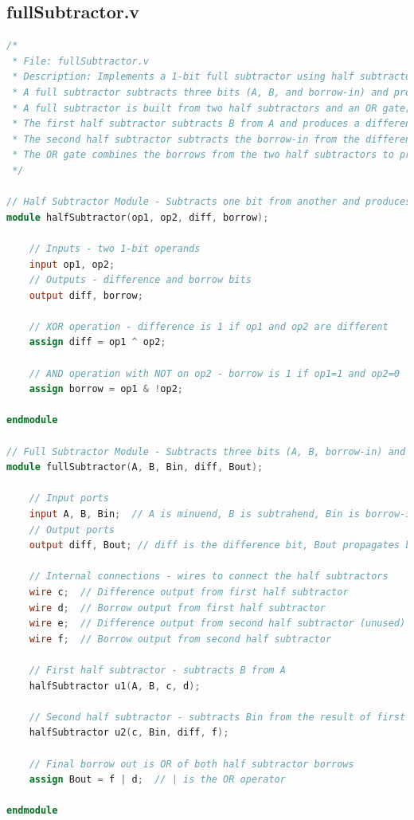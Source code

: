 \documentclass[a4paper,12pt]{article}
\begin{document}
\subsection*{fullSubtractor.v}
\begin{lstlisting}[language=Verilog]
/*
 * File: fullSubtractor.v
 * Description: Implements a 1-bit full subtractor using half subtractors
 * A full subtractor subtracts three bits (A, B, and borrow-in) and produces difference and borrow-out
 * A full subtractor is built from two half subtractors and an OR gate; 
 * The first half subtractor subtracts B from A and produces a difference and a borrow
 * The second half subtractor subtracts the borrow-in from the difference of the first half subtractor
 * The OR gate combines the borrows from the two half subtractors to produce the final borrow-out
 */

// Half Subtractor Module - Subtracts one bit from another and produces difference and borrow
module halfSubtractor(op1, op2, diff, borrow);

    // Inputs - two 1-bit operands
    input op1, op2;
    // Outputs - difference and borrow bits
    output diff, borrow;

    // XOR operation - difference is 1 if op1 and op2 are different
    assign diff = op1 ^ op2;

    // AND operation with NOT on op2 - borrow is 1 if op1=1 and op2=0
    assign borrow = op1 & !op2;

endmodule

// Full Subtractor Module - Subtracts three bits (A, B, borrow-in) and produces difference and borrow-out
module fullSubtractor(A, B, Bin, diff, Bout);

    // Input ports
    input A, B, Bin;  // A is minuend, B is subtrahend, Bin is borrow-in from previous subtraction
    // Output ports
    output diff, Bout; // diff is the difference bit, Bout propagates borrow to next subtraction
    
    // Internal connections - wires to connect the half subtractors
    wire c;  // Difference output from first half subtractor
    wire d;  // Borrow output from first half subtractor
    wire e;  // Difference output from second half subtractor (unused)
    wire f;  // Borrow output from second half subtractor

    // First half subtractor - subtracts B from A
    halfSubtractor u1(A, B, c, d);

    // Second half subtractor - subtracts Bin from the result of first half subtractor
    halfSubtractor u2(c, Bin, diff, f);

    // Final borrow out is OR of both half subtractor borrows
    assign Bout = f | d;  // | is the OR operator

endmodule
\end{lstlisting}
\end{document}
